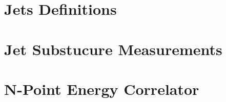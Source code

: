 %
\section{Jets Definitions}
\section{Jet Substucure Measurements}
\section{N-Point Energy Correlator}
%
